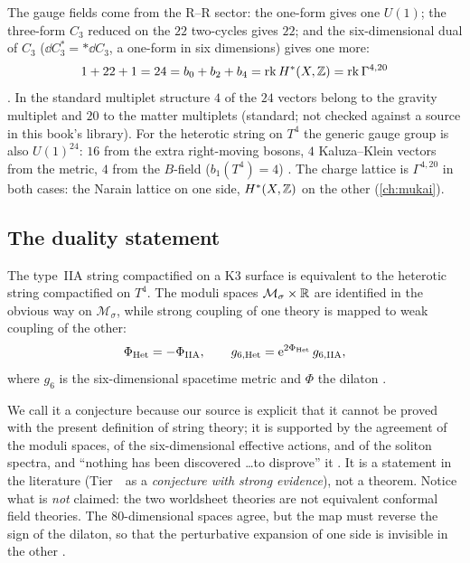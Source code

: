 The gauge fields come from the R--R sector: the one-form gives one $U(1)$; the three-form
$C_3$ reduced on the $22$ two-cycles gives $22$; and the six-dimensional dual of $C_3$
($\dd C_3^*=*\dd C_3$, a one-form in six dimensions) gives one more:
\begin{equation}\label{eq:stringsk3:24}
  1+22+1=24=b_0+b_2+b_4=\operatorname{rk} H^*(X,\mathbb{Z})=\operatorname{rk}\Gamma^{4,20}
\end{equation}
. In the standard multiplet structure $4$ of the $24$ vectors belong to the gravity
multiplet and $20$ to the matter multiplets (standard; not checked against a source in this
book's library). For the heterotic string on $T^4$ the generic
gauge group is also $U(1)^{24}$: $16$ from the extra right-moving bosons, $4$ Kaluza--Klein
vectors from the metric, $4$ from the $B$-field ($b_1(T^4)=4$)
. The charge lattice is $\Gamma^{4,20}$ in both cases: the
Narain lattice on one side, $H^*(X,\mathbb{Z})$ on the other (\cref{ch:mukai}).

\subsection{The duality statement}
\begin{conjecture}
\label{conj:stringsk3:duality}
The type~IIA string compactified on a K3 surface is equivalent to the heterotic string
compactified on $T^4$. The moduli spaces $\mathcal M_\sigma\times\mathbb{R}$ are identified in the
obvious way on $\mathcal M_\sigma$, while strong coupling of one theory is mapped to weak
coupling of the other:
\begin{equation}\label{eq:stringsk3:dilaton}
  \Phi_{\rm Het}=-\Phi_{\rm IIA},\qquad g_{6,\rm Het}=\mathrm{e}^{2\Phi_{\rm Het}}\,g_{6,\rm IIA},
\end{equation}
where $g_6$ is the six-dimensional spacetime metric and $\Phi$ the dilaton
.
\end{conjecture}

We call it a conjecture because our source is explicit that it cannot be proved with the
present definition of string theory; it is supported by the agreement of the moduli spaces,
of the six-dimensional effective actions, and of the soliton spectra, and ``nothing has been
discovered \dots to disprove'' it . It is a statement in the
literature (Tier~\TL\ as a \emph{conjecture with strong evidence}), not a theorem. Notice what
is \emph{not} claimed: the two worldsheet theories are not equivalent conformal field theories.
The $80$-dimensional spaces agree, but the map must reverse the sign of the dilaton, so that
the perturbative expansion of one side is invisible in the other
.

